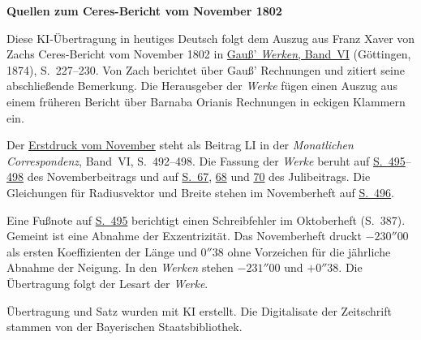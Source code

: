 \clearpage\thispagestyle{empty}
\begin{center}\textbf{Quellen zum Ceres-Bericht vom November 1802}\end{center}
\noindent Diese KI-Übertragung in heutiges Deutsch folgt dem Auszug aus Franz Xaver von Zachs Ceres-Bericht vom November 1802 in \href{https://gdz.sub.uni-goettingen.de/id/PPN236007467}{Gauß’ \textit{Werken}, Band~VI} (Göttingen, 1874), S.~227--230. Von Zach berichtet über Gauß’ Rechnungen und zitiert seine abschließende Bemerkung. Die Herausgeber der \textit{Werke} fügen einen Auszug aus einem früheren Bericht über Barnaba Orianis Rechnungen in eckigen Klammern ein.
\par\smallskip\noindent Der \href{https://api.digitale-sammlungen.de/iiif/image/v2/bsb10538598_00506/full/1450,/0/default.jpg}{Erstdruck vom November} steht als Beitrag LI in der \textit{Monatlichen Correspondenz}, Band~VI, S.~492--498. Die Fassung der \textit{Werke} beruht auf \href{https://api.digitale-sammlungen.de/iiif/image/v2/bsb10538598_00509/full/1450,/0/default.jpg}{S.~495}--\href{https://api.digitale-sammlungen.de/iiif/image/v2/bsb10538598_00512/full/1450,/0/default.jpg}{498} des Novemberbeitrags und auf \href{https://api.digitale-sammlungen.de/iiif/image/v2/bsb10538598_00073/full/1450,/0/default.jpg}{S.~67}, \href{https://api.digitale-sammlungen.de/iiif/image/v2/bsb10538598_00074/full/1450,/0/default.jpg}{68} und \href{https://api.digitale-sammlungen.de/iiif/image/v2/bsb10538598_00076/full/1450,/0/default.jpg}{70} des Julibeitrags. Die Gleichungen für Radiusvektor und Breite stehen im Novemberheft auf \href{https://api.digitale-sammlungen.de/iiif/image/v2/bsb10538598_00510/full/1450,/0/default.jpg}{S.~496}.
\par\smallskip\noindent Eine Fußnote auf \href{https://api.digitale-sammlungen.de/iiif/image/v2/bsb10538598_00509/full/1450,/0/default.jpg}{S.~495} berichtigt einen Schreibfehler im Oktoberheft (S.~387). Gemeint ist eine Abnahme der Exzentrizität. Das Novemberheft druckt \(-230''00\) als ersten Koeffizienten der Länge und \(0''38\) ohne Vorzeichen für die jährliche Abnahme der Neigung. In den \textit{Werken} stehen \(-231''00\) und \(+0''38\). Die Übertragung folgt der Lesart der \textit{Werke}.
\par\smallskip\noindent Übertragung und Satz wurden mit KI erstellt. Die Digitalisate der Zeitschrift stammen von der Bayerischen Staatsbibliothek.
\clearpage
